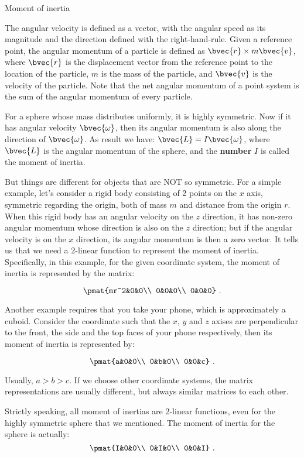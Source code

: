 \begin{example}{Moment of inertia}


The angular velocity is defined as a vector, with the angular speed as its magnitude and the direction defined with the right-hand-rule. Given a reference point, the angular momentum of a particle is defined as $\bvec{r}\times m\bvec{v}$, where $\bvec{r}$ is the displacement vector from the reference point to the location of the particle, $m$ is the mass of the particle, and $\bvec{v}$ is the velocity of the particle. Note that the net angular momentum of a point system is the sum of the angular momentum of every particle. 

For a sphere whose mass distributes uniformly, it is highly symmetric. Now if it has angular velocity $\bvec{\omega}$, then its angular momentum is also along the direction of $\bvec{\omega}$. As result we have: $\bvec{L}=I\bvec{\omega}$, where $\bvec{L}$ is the angular momentum of the sphere, and the \textbf{number} $I$ is called the moment of inertia. 

But things are different for objects that are NOT so symmetric. For a simple example, let's consider a rigid body consisting of 2 points on the $x$ axis, symmetric regarding the origin, both of mass $m$ and distance from the origin $r$. When this rigid body has an angular velocity on the $z$ direction, it has non-zero angular momentum whose direction is also on the $z$ direction; but if the angular velocity is on the $x$ direction, its angular momentum is then a zero vector. It tells us that we need a 2-linear function to represent the moment of inertia. Specifically, in this example, for the given coordinate system, the moment of inertia is represented by the matrix: 

\begin{equation}
\pmat{mr^2&0&0\\ 0&0&0\\ 0&0&0}~.
\end{equation}

Another example requires that you take your phone, which is approximately a cuboid. Consider the coordinate such that the $x$, $y$ and $z$ axises are perpendicular to the front, the side and the top faces of your phone respectively, then its moment of inertia is represented by: 

\begin{equation}
\pmat{a&0&0\\ 0&b&0\\ 0&0&c}~.
\end{equation}

Usually, $a>b>c$. If we choose other coordinate systems, the matrix representations are usually different, but always similar matrices to each other. 

Strictly speaking, all moment of inertias are 2-linear functions, even for the highly symmetric sphere that we mentioned. The moment of inertia for the sphere is actually: 
\begin{equation}
\pmat{I&0&0\\ 0&I&0\\ 0&0&I}~.
\end{equation}
\end{example}

